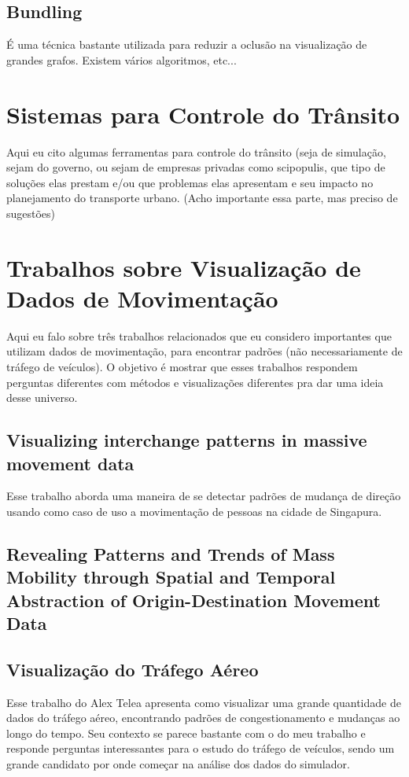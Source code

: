 \subsection{Bundling}
    É uma técnica bastante utilizada para reduzir a oclusão na visualização de grandes
  grafos. Existem vários algoritmos, etc...

\section{Sistemas para Controle do Trânsito}

Aqui eu cito algumas ferramentas para controle do trânsito (seja de simulação, sejam do governo, ou
sejam de empresas privadas como scipopulis, que tipo de soluções elas prestam e/ou
que problemas elas apresentam e seu impacto no planejamento do transporte urbano.
(Acho importante essa parte, mas preciso de sugestões)

\section{Trabalhos sobre Visualização de Dados de Movimentação}

Aqui eu falo sobre três trabalhos relacionados que eu considero importantes que utilizam dados de movimentação,
para encontrar padrões (não necessariamente de tráfego de veículos). O objetivo
é mostrar que esses trabalhos respondem perguntas diferentes com métodos
e visualizações diferentes pra dar uma ideia desse universo.

\subsection{Visualizing interchange patterns in massive movement data}
 Esse trabalho aborda uma maneira de se detectar padrões de mudança de direção
usando como caso de uso a movimentação de pessoas na cidade de Singapura.

\subsection{Revealing Patterns and Trends of Mass Mobility through Spatial
and Temporal Abstraction of Origin-Destination Movement Data}

\subsection{Visualização do Tráfego Aéreo}
 Esse trabalho do Alex Telea apresenta como visualizar uma grande quantidade
de dados do tráfego aéreo, encontrando padrões de congestionamento e mudanças
ao longo do tempo. Seu contexto se parece bastante com o do meu trabalho
e responde perguntas interessantes para o estudo do tráfego de veículos, sendo
um grande candidato por onde começar na análise dos dados do simulador.

